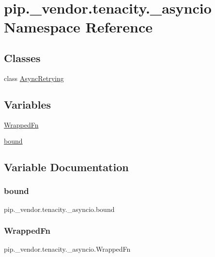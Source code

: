 \hypertarget{namespacepip_1_1__vendor_1_1tenacity_1_1__asyncio}{}\section{pip.\+\_\+vendor.\+tenacity.\+\_\+asyncio Namespace Reference}
\label{namespacepip_1_1__vendor_1_1tenacity_1_1__asyncio}
\subsection*{Classes}
\begin{DoxyCompactItemize}
\item 
class \hyperlink{classpip_1_1__vendor_1_1tenacity_1_1__asyncio_1_1AsyncRetrying}{Async\+Retrying}
\end{DoxyCompactItemize}
\subsection*{Variables}
\begin{DoxyCompactItemize}
\item 
\hyperlink{namespacepip_1_1__vendor_1_1tenacity_1_1__asyncio_a311317726b2ab8add4432a20b666220a}{Wrapped\+Fn}
\item 
\hyperlink{namespacepip_1_1__vendor_1_1tenacity_1_1__asyncio_a2881c86f4a3717893dddcb5a2f5f14c7}{bound}
\end{DoxyCompactItemize}


\subsection{Variable Documentation}
\mbox{\label{namespacepip_1_1__vendor_1_1tenacity_1_1__asyncio_a2881c86f4a3717893dddcb5a2f5f14c7}} 
\subsubsection{\texorpdfstring{bound}{bound}}
{\footnotesize\ttfamily pip.\+\_\+vendor.\+tenacity.\+\_\+asyncio.\+bound}

\mbox{\label{namespacepip_1_1__vendor_1_1tenacity_1_1__asyncio_a311317726b2ab8add4432a20b666220a}} 
\subsubsection{\texorpdfstring{Wrapped\+Fn}{WrappedFn}}
{\footnotesize\ttfamily pip.\+\_\+vendor.\+tenacity.\+\_\+asyncio.\+Wrapped\+Fn}

